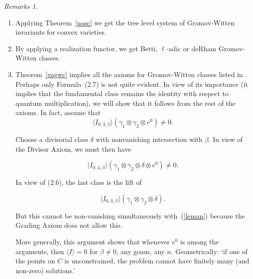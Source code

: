\documentclass[11pt]{amsart}
\theoremstyle{definition}
\theoremstyle{remark}
\newtheorem{rmks}{Remarks}\renewcommand{\thermks}{}
\newcommand{\noprint}[1]{}
\newcommand{\upst}{^{\ast}}
\renewcommand{\ll}{{\mathbb{L}}}
\theoremstyle{plain}
\theoremstyle{definition}
\theoremstyle{remark}
\begin{document}
\begin{rmks}
\begin{enumerate}
\item
Applying Theorem~\ref{uosc} we get the tree level system of Gromov-Witten
invariants for convex varieties.
\item
By applying a realization functor, we get Betti, \(\ell\)-adic or deRham
Gromov-Witten classes.
\item
Theorem~\ref{vagwc} implies all the axioms for Gromov-Witten classes listed in
\cite{KM}. Perhaps only Formula~(2.7) is
not quite evident. In view of its importance (it implies that the fundamental
class remains the identity with respect to
quantum multiplication), we will show that it follows from the rest of the
axioms.  In fact, assume that
\begin{equation} \label{leman}
\langle I_{0,3,\beta}\rangle (\gamma_1\otimes\gamma_2\otimes e^0) \ne 0.
\end{equation}

Choose a divisorial class \(\delta\) with nonvanishing intersection with \(\beta\).
In view of the Divisor Axiom, we must
then have

\[
\langle I_{0,4,\beta}\rangle (\gamma_1\otimes\gamma_2\otimes\delta\otimes
e^0) \ne 0.
\]

In view of (2.6), the last class is the lift of

\[
\langle I_{0,3,\beta}\rangle (\gamma_1\otimes\gamma_2\otimes\delta ).
\]

But this cannot be non-vanishing simultaneously with~(\ref{leman}) because the
Grading Axiom does not allow this.

More generally, this argument shows that whenever \(e^0\) is among the arguments,
then \(\langle I\rangle = 0\) for \(\beta
\ne 0\), any genus, any \(n.\) Geometrically: `if one of the points on \(C\) is
unconstrained, the problem cannot have
finitely many (and non-zero) solutions.'

\noprint{The composition
\[
h(V)^{\otimes2}{-\dim V}\stackrel{p\upst}{\longrightarrow}
h(V)^{\otimes3}{-\dim
V}\stackrel{I_{0,3}(V,\beta)}{\longrightarrow}\ll^{\beta(\omega_V)}
\]
is zero, if \(\beta\not=0\). Here \(p:V^3\rightarrow V^2\) is a projection.}

\end{enumerate}
\end{rmks}
\end{document}
